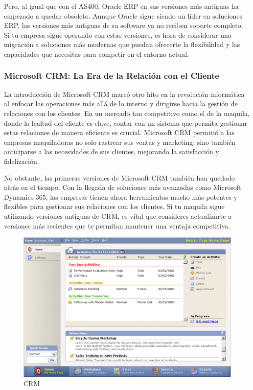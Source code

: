 \documentclass[
  10pt,
  letterpaper,
]{book}
\begin{document}
Pero, al igual que con el AS400, Oracle ERP en sus versiones más
antiguas ha empezado a quedar obsoleto. Aunque Oracle sigue siendo un
líder en soluciones ERP, las versiones más antiguas de su software ya no
reciben soporte completo. Si tu empresa sigue operando con estas
versiones, es hora de considerar una migración a soluciones más modernas
que puedan ofrecerte la flexibilidad y las capacidades que necesitas
para competir en el entorno actual.

\subsubsection{Microsoft CRM: La Era de la Relación con el
Cliente}\label{microsoft-crm-la-era-de-la-relaciuxf3n-con-el-cliente}

La introducción de Microsoft CRM marcó otro hito en la revolución
informática al enfocar las operaciones más allá de lo interno y
dirigirse hacia la gestión de relaciones con los clientes. En un mercado
tan competitivo como el de la maquila, donde la lealtad del cliente es
clave, contar con un sistema que permita gestionar estas relaciones de
manera eficiente es crucial. Microsoft CRM permitió a las empresas
maquiladoras no solo rastrear sus ventas y marketing, sino también
anticiparse a las necesidades de sus clientes, mejorando la satisfacción
y fidelización.

No obstante, las primeras versiones de Microsoft CRM también han quedado
atrás en el tiempo. Con la llegada de soluciones más avanzadas como
Microsoft Dynamics 365, las empresas tienen ahora herramientas mucho más
potentes y flexibles para gestionar sus relaciones con los clientes. Si
tu maquila sigue utilizando versiones antiguas de CRM, es vital que
consideres actualizarte a versiones más recientes que te permitan
mantener una ventaja competitiva.

\begin{figure}[H]

{\centering \includegraphics{Img/crm.png}

}

\caption{CRM}

\end{figure}%
\end{document}
